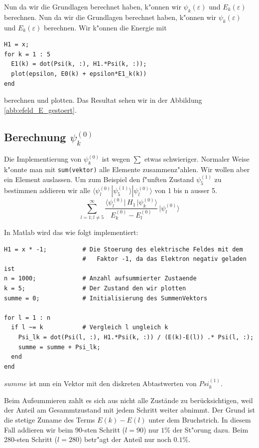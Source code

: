\begin{refsection}
Nun da wir die Grundlagen berechnet haben, k"onnen wir $\psi_k(\varepsilon)$ und $E_k(\varepsilon)$ berechnen.
Nun da wir die Grundlagen berechnet haben, k"onnen wir $\psi_k(\varepsilon)$ und $E_k(\varepsilon)$ berechnen.
Wir k"onnen die Energie mit
\begin{lstlisting}[style=Matlab]
H1 = x;
for k = 1 : 5
  E1(k) = dot(Psi(k, :), H1.*Psi(k, :));
  plot(epsilon, E0(k) + epsilon*E1_k(k))
end
\end{lstlisting}
berechnen und plotten.
Das Resultat sehen wir in der Abbildung \ref{abb:efeld_E_gestoert}.

\subsection{Berechnung $\psi_k^{(0)}$} %

Die Implementierung von $\psi_k^{(0)}$ ist wegen $\sum$ etwas schwieriger.
Normaler Weise k"onnte man mit \verb|sum(vektor)| alle Elemente zusammenz"ahlen.
Wir wollen aber ein Element auslassen.
Um zum Beispiel den f"unften Zustand $\psi_5^{(1)}$ zu bestimmen addieren wir alle 
$\langle\psi_l^{(0)}|\psi_5^{(1)}\rangle|\psi_l^{(0)}\rangle$
 von 1 bis n ausser 5.
\begin{equation}
  \sum_{l=1 ; l\ne 5}^{\infty}
    \frac{\langle \psi_l^{(0)}|\, H_1 \,|\psi_k^{(0)}\rangle}{E_k^{(0)}-E_l^{(0)}}
        \,
    |\psi_l^{(0)}\rangle
\end{equation}

In Matlab wird das wie folgt implementiert:
\begin{lstlisting}[style=Matlab]
H1 = x * -1;          # Die Stoerung des elektrische Feldes mit dem
                      #   Faktor -1, da das Elektron negativ geladen ist
n = 1000;             # Anzahl aufsummierter Zustaende
k = 5;                # Der Zustand den wir plotten
summe = 0;            # Initialisierung des SummenVektors

for l = 1 : n
  if l ~= k           # Vergleich l ungleich k
    Psi_lk = dot(Psi(l, :), H1.*Psi(k, :)) / (E(k)-E(l)) .* Psi(l, :);
    summe = summe + Psi_lk;
  end
end
\end{lstlisting}
$summe$ ist nun ein Vektor mit den diskreten Abtastwerten von $Psi_k^{(1)}$.

Beim Aufsummieren zahlt es sich aus nicht alle Zust\"ande zu ber\"ucksichtigen, weil der Anteil am Gesammtzustand 
mit jedem Schritt weiter abnimmt. Der Grund ist die stetige Zuname des Terms $E(k)-E(l)$ unter dem Bruchstrich.
In diesem Fall addieren wir beim 90-sten Schritt ($l=90$) nur $1\%$ der St"orung dazu.
Beim 280-sten Schritt ($l=280$) betr"agt der Anteil nur noch $0.1\%$.


\end{refsection}
